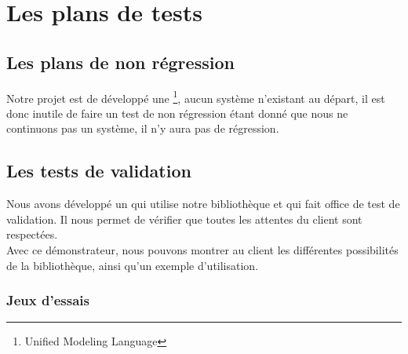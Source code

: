 \documentclass[12pt,a4paper,openany]{report}
\begin{document}
	\maketitle
	\newpage
	\setcounter{tocdepth}{3}
	\setcounter{secnumdepth}{3}
	
	\tableofcontents
	\newpage
	\chapter{Les plans de tests}
	\section{Les plans de non régression}
	Notre projet est de développé une   \footnote{Unified Modeling Language}, aucun système n'existant
	au départ, il est donc inutile de faire un test de non régression étant donné que nous ne continuons pas un système, il n'y aura pas 
	de régression.
	\section{Les tests de validation}
	Nous avons développé un  qui utilise notre bibliothèque et qui fait office de test de validation. Il nous permet de vérifier que toutes les attentes du client sont respectées. \\
		Avec ce démonstrateur, nous pouvons montrer au client les différentes possibilités de la bibliothèque, ainsi qu'un exemple d'utilisation.

		\subsection{Jeux d'essais}
\end{document}

